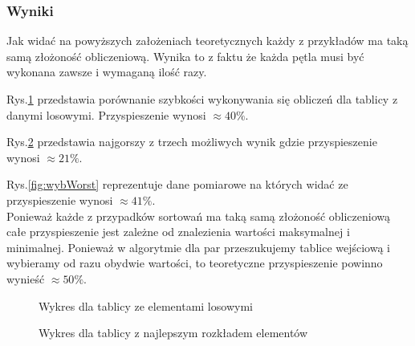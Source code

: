 \subsubsection*{Wyniki}
Jak widać na powyższych założeniach teoretycznych każdy z przykładów ma taką samą złożoność obliczeniową. Wynika to z faktu że każda pętla musi być wykonana zawsze i wymaganą ilość razy.	
\par Rys.\ref{fig:wyb} przedstawia porównanie szybkości wykonywania się obliczeń dla tablicy z danymi losowymi. Przyspieszenie wynosi $\approx 40\%$. 
\par Rys.\ref{fig:wybBest} przedstawia najgorszy z trzech możliwych wynik gdzie przyspieszenie wynosi $\approx 21\%$. 
\par Rys.\ref{fig:wybWorst} reprezentuje dane pomiarowe na których widać ze przyspieszenie wynosi $\approx 41\%$. \\
Ponieważ każde z przypadków sortowań ma taką samą złożoność obliczeniową całe przyspieszenie jest zależne od znalezienia wartości maksymalnej i minimalnej. Ponieważ w algorytmie dla par przeszukujemy tablice wejściową i wybieramy od razu obydwie wartości, to teoretyczne przyspieszenie powinno wynieść $\approx 50\%$.
\begin{figure}[h!]
  \begin{center}
    \caption{Wykres dla tablicy ze elementami losowymi}\label{fig:wyb}
  \end{center}
  \end{figure}
  \begin{figure}[h!]
  \begin{center}
    \caption{Wykres dla tablicy z najlepszym rozkładem elementów}\label{fig:wybBest}
  \end{center}
  \end{figure}
